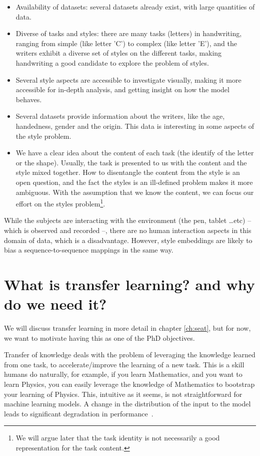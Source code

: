   \begin{itemize}
    \item Availability of datasets: several datasets already exist, with large quantities of data.
    \item Diverse of tasks and styles: there are many tasks (letters) in handwriting, ranging from simple (like letter 'C') to complex (like letter 'E'), and the writers exhibit a diverse set of styles on the different tasks, making handwriting a good candidate to explore the problem of styles.
    \item Several style aspects are accessible to investigate visually, making it more accessible for in-depth analysis, and getting insight on how the model behaves.
    \item Several datasets provide information about the writers, like the age, handedness, gender and the origin. This data is interesting in some aspects of the style problem.
    \item We have a clear idea about the content of each task (the identify of the letter or the shape). Usually, the task is presented to us with the content and the style mixed together. How to disentangle the content from the style is an open question, and the fact the styles is an ill-defined problem makes it more ambiguous. With the assumption that we know the content, we can focus our effort on the styles problem\footnote{We will argue later that the task identity is not necessarily a good representation for the task content.}.
  \end{itemize}
  While the subjects are interacting with the environment (the pen, tablet \dots etc) -- which is observed and recorded --, there are no human interaction aspects in this domain of data, which is a disadvantage. However, style embeddings are likely to bias a sequence-to-sequence mappings in the same way.

\section{What is transfer learning? and why do we need it?}
\par We will discuss transfer learning in more detail in chapter \ref{ch:seat}, but for now, we want to motivate having this as one of the PhD objectives.

\par Transfer of knowledge deals with the problem of leveraging the knowledge learned from one task, to accelerate/improve the learning of a new task. This is a skill humans do naturally, for example, if you learn Mathematics, and you want to learn Physics, you can easily leverage the knowledge of Mathematics to bootstrap your learning of Physics. This, intuitive as it seems, is not straightforward for machine learning models. A change in the distribution of the input to the model leads to significant degradation in performance~\citep{shimodaira2000improving}.

